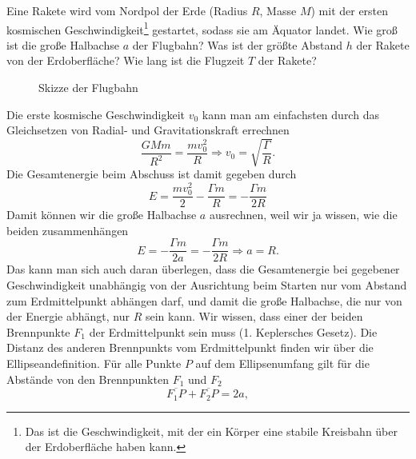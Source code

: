\begin{Exercise}[title = Ballistische Rakete, origin = J. Kaalda, difficulty =3, label = cmellipse]
	Eine Rakete wird vom Nordpol der Erde (Radius $R$, Masse $M$) mit der ersten kosmischen Geschwindigkeit\footnote[2]{Das ist die Geschwindigkeit, mit der ein Körper eine stabile Kreisbahn über der Erdoberfläche haben kann.} gestartet, sodass sie am Äquator landet. 
	\Question Wie groß ist die große Halbachse $a$ der Flugbahn?
	\Question Was ist der größte Abstand $h$ der Rakete von der Erdoberfläche?
	\Question Wie lang ist die Flugzeit $T$ der Rakete?
\end{Exercise}
\begin{Answer}[ref = cmellipse]
	\begin{figure}[h]
		\centering
		
		\caption{Skizze der Flugbahn}
		\label{fig:cmellsk}
	\end{figure}
	\Question Die erste kosmische Geschwindigkeit $v_0$ kann man am einfachsten durch das Gleichsetzen von  Radial- und Gravitationskraft errechnen
	\begin{equation*}\label{cmellipse:vo}
		\frac{GMm}{R^2} = \frac{mv_0^2}{R} \Rightarrow v_0 = \sqrt{\frac{\Gamma}{R}}.
	\end{equation*}
	Die Gesamtenergie beim Abschuss ist damit gegeben durch
	\begin{equation*}
		E = \frac{mv_0^2}{2} - \frac{\Gamma m}{R} = -\frac{\Gamma m}{2R}
	\end{equation*}
	Damit können wir die große Halbachse $a$ ausrechnen, weil wir ja wissen, wie die beiden zusammenhängen
	\begin{equation}\label{cmellipse:sma}
	\boxed{
		E = -\frac{\Gamma m}{2a} = -\frac{\Gamma m}{2R} \Rightarrow a = R.}
	\end{equation}
	Das kann man sich auch daran überlegen, dass die Gesamtenergie bei gegebener Geschwindigkeit unabhängig von der Ausrichtung beim Starten nur vom Abstand zum Erdmittelpunkt abhängen darf, und damit die große Halbachse, die nur von der Energie abhängt, nur $R$ sein kann.
	\Question Wir wissen, dass einer der beiden Brennpunkte $F_1$ der Erdmittelpunkt sein muss (1. Keplersches Gesetz). Die Distanz des anderen Brennpunkts vom Erdmittelpunkt finden wir über die Ellipseandefinition. Für alle Punkte $P$ auf dem Ellipsenumfang gilt für die Abstände von den Brennpunkten $F_1$ und $F_2$
	\begin{equation}\label{cmellipse:edef}
	\overline{F_1P} + \overline{F_2P} = 2a,
	\end{equation}

\end{Answer}
